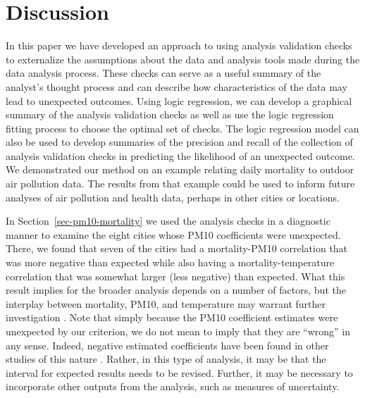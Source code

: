 \documentclass[
  12pt,
]{interact}
\begin{document}
\section{Discussion}\label{sec-discussion}

In this paper we have developed an approach to using analysis validation
checks to externalize the assumptions about the data and analysis tools
made during the data analysis process. These checks can serve as a
useful summary of the analyst's thought process and can describe how
characteristics of the data may lead to unexpected outcomes. Using logic
regression, we can develop a graphical summary of the analysis
validation checks as well as use the logic regression fitting process to
choose the optimal set of checks. The logic regression model can also be
used to develop summaries of the precision and recall of the collection
of analysis validation checks in predicting the likelihood of an
unexpected outcome. We demonstrated our method on an example relating
daily mortality to outdoor air pollution data. The results from that
example could be used to inform future analyses of air pollution and
health data, perhaps in other cities or locations.

In Section~\ref{sec-pm10-mortality} we used the analysis checks in a
diagnostic manner to examine the eight cities whose PM10 coefficients
were unexpected. There, we found that seven of the cities had a
mortality-PM10 correlation that was more negative than expected while
also having a mortality-temperature correlation that was somewhat larger
(less negative) than expected. What this result implies for the broader
analysis depends on a number of factors, but the interplay between
mortality, PM10, and temperature may warrant further investigation
\citep[see e.g.][]{welty2005acute}. Note that simply because the PM10
coefficient estimates were unexpected by our criterion, we do not mean
to imply that they are ``wrong'' in any sense. Indeed, negative
estimated coefficients have been found in other studies of this nature
\citep{bell2004ozone}. Rather, in this type of analysis, it may be that
the interval for expected results needs to be revised. Further, it may
be necessary to incorporate other outputs from the analysis, such as
measures of uncertainty.
\end{document}
